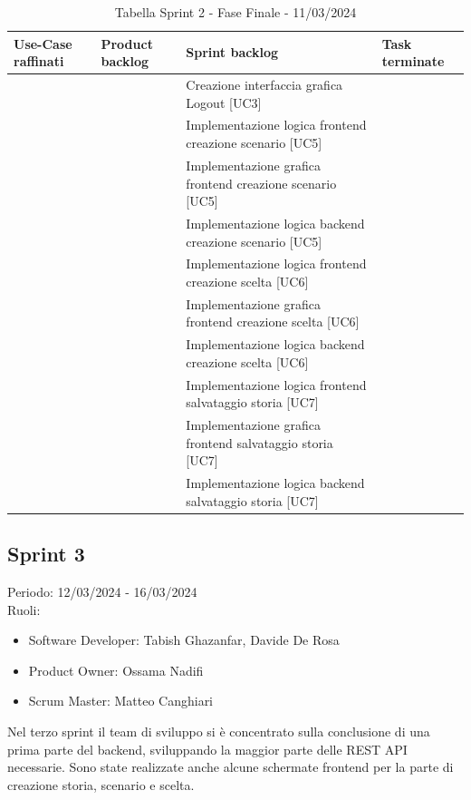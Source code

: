 \documentclass{article}
\begin{document}
\begin{table}[h]
    \centering
    \begin{tabularx}{\textwidth}{|X|X|X|X|}
        \hline
        \bf Use-Case raffinati & \bf Product backlog & \bf Sprint backlog & \bf Task terminate \\
        \hline
        & & Creazione interfaccia grafica Logout [UC3] & \\
        \hline
        & & Implementazione logica frontend creazione scenario [UC5] & \\
        \hline
        & & Implementazione grafica frontend creazione scenario [UC5] & \\
        \hline
        & & Implementazione logica backend creazione scenario [UC5] & \\
        \hline
        & & Implementazione logica frontend creazione scelta [UC6] & \\
        \hline
        & & Implementazione grafica frontend creazione scelta [UC6] & \\
        \hline
        & & Implementazione logica backend creazione scelta [UC6] & \\
        \hline
        & & Implementazione logica frontend salvataggio storia [UC7] & \\
        \hline
        & & Implementazione grafica frontend salvataggio storia [UC7] & \\
        \hline
        & & Implementazione logica backend salvataggio storia [UC7] & \\
        \hline
    \end{tabularx}
    \caption*{Tabella Sprint 2 - Fase Finale - 11/03/2024}
\end{table}

\clearpage
\subsection{Sprint 3}
Periodo: 12/03/2024 - 16/03/2024\vspace*{7pt}\\
Ruoli:
\begin{itemize}[label = { }]
    \itemsep0em
    \item Software Developer: Tabish Ghazanfar, Davide De Rosa
    \item Product Owner: Ossama Nadifi 
    \item Scrum Master: Matteo Canghiari
\end{itemize}
Nel terzo sprint il team di sviluppo si è concentrato sulla conclusione di una prima parte del backend, sviluppando la maggior parte delle REST API necessarie. Sono state realizzate anche alcune schermate frontend per la parte di creazione storia, scenario e scelta.
\end{document}
